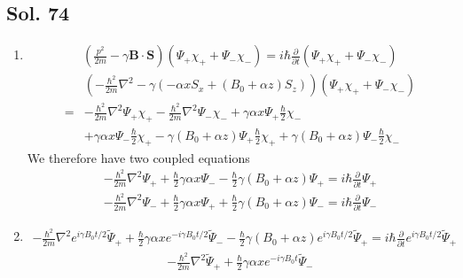  \subsection*{Sol. 74}
 \begin{enumerate}
     \item 
     \begin{align*}
         (\frac{p^2}{2m}-\gamma\bm B\cdot\bm S)
         (\Psi_+\chi_++\Psi_-\chi_-)
         =i\hbar\frac{\partial}{\partial t}
         (\Psi_+\chi_++\Psi_-\chi_-)
     \end{align*}
     \begin{align*}
         &(-\frac{\hbar^2}{2m}\nabla^2
         -\gamma(-\alpha xS_x+(B_0+\alpha z)S_z))
         (\Psi_+\chi_++\Psi_-\chi_-)\\
         =&
         -\frac{\hbar^2}{2m}\nabla^2\Psi_+\chi_+
         -\frac{\hbar^2}{2m}\nabla^2\Psi_-\chi_-
         +\gamma\alpha x\Psi_+\frac{\hbar}{2}\chi_-\\
         &+\gamma\alpha x\Psi_-\frac{\hbar}{2}\chi_+
         -\gamma(B_0+\alpha z)\Psi_+\frac{\hbar}{2}\chi_+
         +\gamma(B_0+\alpha z)\Psi_-\frac{\hbar}{2}\chi_-
     \end{align*}
     We therefore have two coupled equations
     \begin{align*}
         -\frac{\hbar^2}{2m}\nabla^2\Psi_+
         +\frac{\hbar}{2}\gamma\alpha x\Psi_- 
         -\frac{\hbar}{2}\gamma (B_0+\alpha z)\Psi_+ = 
         i\hbar \frac{\partial}{\partial t}\Psi_+
     \end{align*}
     \begin{align*}
         -\frac{\hbar^2}{2m}\nabla^2\Psi_-
         +\frac{\hbar}{2}\gamma\alpha x\Psi_+ 
         +\frac{\hbar}{2}\gamma (B_0+\alpha z)\Psi_- = 
         i\hbar \frac{\partial}{\partial t}\Psi_-
     \end{align*}
     \item 
     \begin{align*}
         -\frac{\hbar^2}{2m}\nabla^2
         e^{i\gamma B_0t/2}\tilde\Psi_+
         +\frac{\hbar}{2}\gamma\alpha x
         e^{-i\gamma B_0t/2}\tilde\Psi_-
         -\frac{\hbar}{2}\gamma (B_0+\alpha z)
         e^{i\gamma B_0t/2}\tilde\Psi_+= 
         i\hbar \frac{\partial}{\partial t}
         e^{i\gamma B_0t/2}\tilde\Psi_+
     \end{align*}
     \begin{align*}
         -\frac{\hbar^2}{2m}\nabla^2
         \tilde\Psi_+
         +\frac{\hbar}{2}\gamma\alpha x
         e^{-i\gamma B_0t}\tilde\Psi_-

\end{align*}
\end{enumerate}
